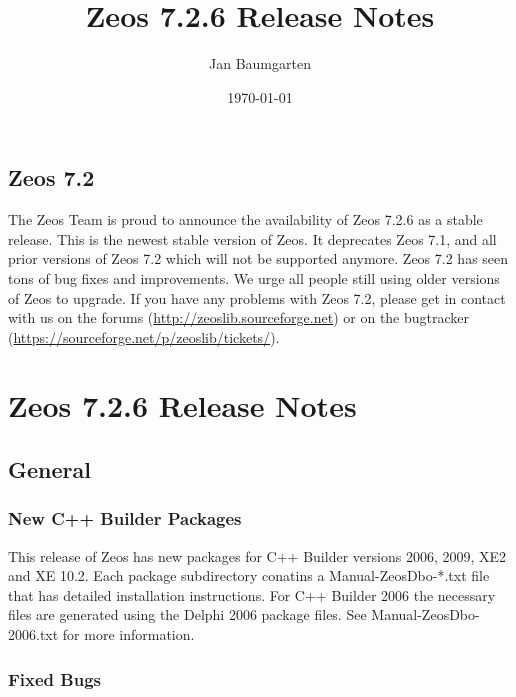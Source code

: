 \documentclass[a4paper,12pt,oneside]{book}
\title{Zeos 7.2.6 Release Notes}
\author{Jan Baumgarten}
\date{\today}
\begin{document}
\maketitle

\section*{Zeos 7.2}
The Zeos Team is proud to announce the availability of Zeos 7.2.6 as a stable release.
This is the newest stable version of Zeos.
It deprecates Zeos 7.1, and all prior versions of Zeos 7.2 which will not be supported anymore.
Zeos 7.2 has seen tons of bug fixes and improvements.
We urge all people still using older versions of Zeos to upgrade.
If you have any problems with Zeos 7.2, please get in contact with us on the forums (\url{http://zeoslib.sourceforge.net}) or on the bugtracker (\url{https://sourceforge.net/p/zeoslib/tickets/}).

\chapter{Zeos 7.2.6 Release Notes}

\section{General}
\label{sec:Rev6_General}

\subsection{New C++ Builder Packages}
\label{sec:Rev6_General_CppBuilderPackages}
This release of Zeos has new packages for C++ Builder versions 2006, 2009, XE2 and XE 10.2.
Each package subdirectory conatins a Manual-ZeosDbo-*.txt file that has detailed installation instructions.
For C++ Builder 2006 the necessary files are generated using the Delphi 2006 package files.
See Manual-ZeosDbo-2006.txt for more information.

\subsection{Fixed Bugs}
\label{sec:Rev6_General_FixedBugs}
\end{document}
